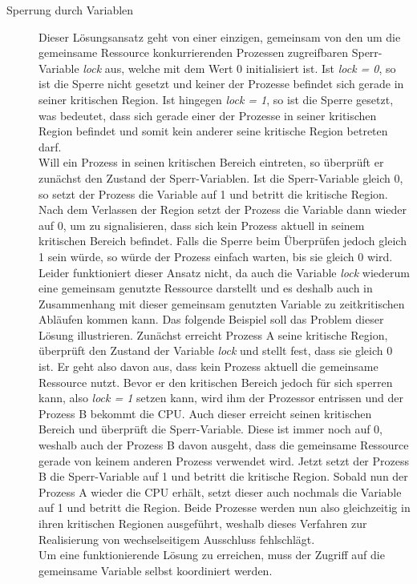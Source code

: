 \begin{description}
						\begin{description}
							\item[Sperrung durch Variablen]
							
								Dieser Lösungsansatz geht von einer einzigen, gemeinsam von den um die gemeinsame Ressource konkurrierenden Prozessen zugreifbaren Sperr-Variable \textit{lock} aus, welche mit dem Wert 0 initialisiert ist. Ist \textit{lock = 0}, so ist die Sperre nicht gesetzt und keiner der Prozesse befindet sich gerade in seiner kritischen Region. Ist hingegen \textit{lock = 1}, so ist die Sperre gesetzt, was bedeutet, dass sich gerade einer der Prozesse in seiner kritischen Region befindet und somit kein anderer seine kritische Region betreten darf.\\
								Will ein Prozess in seinen kritischen Bereich eintreten, so überprüft er zunächst den Zustand der Sperr-Variablen. Ist die Sperr-Variable gleich 0, so setzt der Prozess die Variable auf 1 und betritt die kritische Region. Nach dem Verlassen der Region setzt der Prozess die Variable dann wieder auf 0, um zu signalisieren, dass sich kein Prozess aktuell in seinem kritischen Bereich befindet. Falls die Sperre beim Überprüfen jedoch gleich 1 sein würde, so würde der Prozess einfach warten, bis sie gleich 0 wird.\\
								Leider funktioniert dieser Ansatz nicht, da auch die Variable \textit{lock} wiederum eine gemeinsam genutzte Ressource darstellt und es deshalb auch in Zusammenhang mit dieser gemeinsam genutzten Variable zu zeitkritischen Abläufen kommen kann. Das folgende Beispiel soll das Problem dieser Lösung illustrieren. Zunächst erreicht Prozess A seine kritische Region, überprüft den Zustand der Variable \textit{lock} und stellt fest, dass sie gleich 0 ist. Er geht also davon aus, dass kein Prozess aktuell die gemeinsame Ressource nutzt. Bevor er den kritischen Bereich jedoch für sich sperren kann, also \textit{lock = 1} setzen kann, wird ihm der Prozessor entrissen und der Prozess B bekommt die CPU. Auch dieser erreicht seinen kritischen Bereich und überprüft die Sperr-Variable. Diese ist immer noch auf 0, weshalb auch der Prozess B davon ausgeht, dass die gemeinsame Ressource gerade von keinem anderen Prozess verwendet wird. Jetzt setzt der Prozess B die Sperr-Variable auf 1 und betritt die kritische Region. Sobald nun der Prozess A wieder die CPU erhält, setzt dieser auch nochmals die Variable auf 1 und betritt die Region. Beide Prozesse werden nun also gleichzeitig in ihren kritischen Regionen ausgeführt, weshalb dieses Verfahren zur Realisierung von wechselseitigem Ausschluss fehlschlägt.\\
								Um eine funktionierende Lösung zu erreichen, muss der Zugriff auf die gemeinsame Variable selbst koordiniert werden.
								

\end{description}
\end{description}
